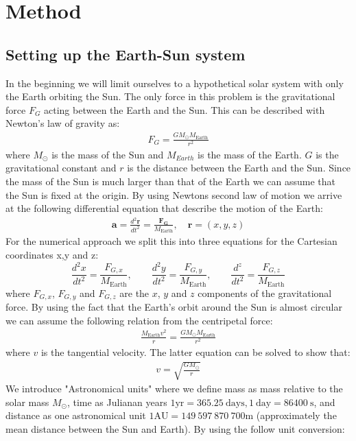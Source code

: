 \documentclass[american,a4paper,12pt]{article}
\renewcommand{\vec}[1]{\mathbf{#1}} %
\newcommand{\ME}{\ensuremath{M_{\text{Earth}}}} %
\newcommand{\MS}{\ensuremath{M_{\odot}}} %
\begin{document}
\newpage
\section{Method}
\subsection{Setting up the Earth-Sun system}
In the beginning we will limit ourselves to a hypothetical solar system with only the Earth orbiting the Sun. The only force in this problem is the gravitational force $F_G$ acting between the Earth and the Sun. This can be described with Newton's law of gravity as:
\begin{align*}
    F_G = \frac{G\MS\ME}{r^2}
\end{align*}
where $M_{\odot}$ is the mass of the Sun and $M_{Earth}$ is the mass of the Earth. $G$ is the gravitational constant and $r$ is the distance between the Earth and the Sun. Since the mass of the Sun is much larger than that of the Earth we can assume that the Sun is fixed at the origin. By using Newtons second law of motion we arrive at the following differential equation that describe the motion of the Earth:
\begin{align*}
    \vec{a} = \frac{d^2\vec{r}}{dt^2} = \frac{\vec{F_G}}{\ME}, \quad \vec{r} = (x, y, z)
\end{align*}
For the numerical approach we split this into three equations for the Cartesian coordinates x,y and z:
\begin{equation}
    \frac{d^2x}{dt^2} = \frac{F_{G,x}}{\ME}, \qquad 
    \frac{d^2y}{dt^2} = \frac{F_{G,y}}{\ME}, \qquad
    \frac{d^z}{dt^2} = \frac{F_{G,z}}{\ME}
    \label{eq:Earth_ODE}
\end{equation}
where $F_{G,x}$, $F_{G,y}$ and $F_{G,z}$ are the $x$, $y$ and $z$ components of the gravitational force. By using the fact that the Earth's orbit around the Sun is almost circular we can assume the following relation from the centripetal force:
\begin{align*}
    \frac{\ME v^2}{r} = \frac{G\MS\ME}{r^2}
\end{align*}
where $v$ is the tangential velocity. The latter equation can be solved to show that:
\begin{align*}
    v = \sqrt{\frac{G\MS}{r}} 
\end{align*}
We introduce "Astronomical units" where we define mass as mass relative to the solar mass $\MS$, time as Julianan years $1 \text{yr} = 365.25\ \text{days},1\ \text{day} = 86400\ \text{s} $, and distance as one astronomical unit $1 \text{AU} = 149\ 597\ 870\ 700$m (approximately the mean distance between the Sun and Earth). By using the follow unit conversion: 
\end{document}

